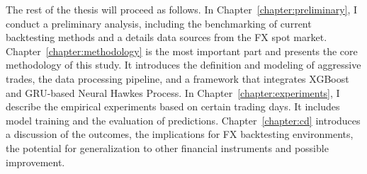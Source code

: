 
The rest of the thesis will proceed as follows. In Chapter~\ref{chapter:preliminary}, I conduct a preliminary analysis, including the benchmarking of current backtesting methods and a details data sources from the FX spot market. Chapter~\ref{chapter:methodology} is the most important part and presents the core methodology of this study. It introduces the definition and modeling of aggressive trades, the data processing pipeline, and a framework that integrates XGBoost and GRU-based Neural Hawkes Process. In Chapter~\ref{chapter:experiments}, I describe the empirical experiments based on certain trading days. It includes model training and the evaluation of predictions. Chapter~\ref{chapter:cd} introduces a discussion of the outcomes, the implications for FX backtesting environments, the potential for generalization to other financial instruments and possible improvement.